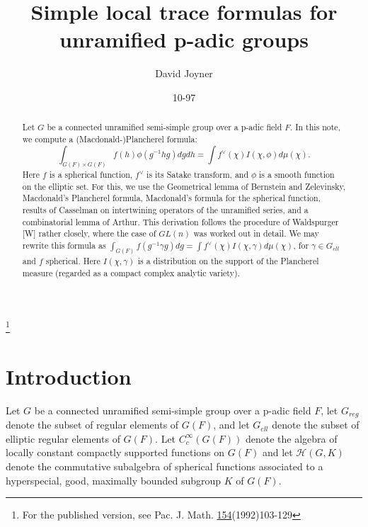 \documentclass[12pt]{article}
\begin{document}
\title{Simple local trace formulas for unramified p-adic groups}
\author{David Joyner}
\date{10-97}
\maketitle
\noindent\footnote{For the published version, see Pac. J. Math. \underline{154}(1992)103-129}

\begin{abstract}
Let $G$ be a connected unramified semi-simple group over a p-adic field $F$. In this note, we compute a (Macdonald-)Plancherel formula:
\[
\int_{G(F)\times G(F)} f(h)\phi(g^{-1}hg)dgdh=\int f^\vee(\chi)I(\chi,\phi)d\mu(\chi).
\]
Here $f$ is a spherical function, $f^\vee$ is its Satake transform, and $\phi$ is a smooth function on the elliptic set. For this, we use the Geometrical lemma of Bernstein and Zelevinsky, Macdonald's Plancherel formula, Macdonald's formula for the spherical function, results of Casselman on intertwining operators of the unramified series, and a combinatorial lemma of Arthur. This derivation follows the procedure of Waldspurger [W] rather closely, where the case of $GL(n)$ was worked out in detail. We may rewrite this formula as $\int_{G(F)} f(g^{-1}\gamma g)dg=\int f^\vee(\chi)I(\chi,\gamma)d\mu(\chi)$, for $\gamma\in G_{ell}$ and $f$ spherical. Here $I(\chi,\gamma)$ is a distribution on the support of the Plancherel measure (regarded as a compact complex analytic variety).
\end{abstract}

\tableofcontents

\section{Introduction}

Let $G$ be a connected unramified semi-simple group over a p-adic field $F$, let $G_{reg}$ denote the subset of regular elements of $G(F)$, and let $G_{ell}$ denote the subset of elliptic regular elements of $G(F)$. Let $C_c^\infty(G(F))$ denote the algebra of locally constant compactly supported functions on $G(F)$ and let $\mathcal{H}(G,K)$ denote the commutative subalgebra of spherical functions associated to a hyperspecial, good, maximally bounded subgroup $K$ of $G(F)$.
\end{document}
